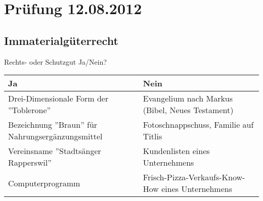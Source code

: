 \section{Prüfung 12.08.2012}
\subsection{Immaterialgüterrecht}
Rechts- oder Schutzgut Ja/Nein?\\
\begin{tabular}{|l|l|}
	\hline 
	\textbf{Ja} & \textbf{Nein} \\ 
	\hline 
	Drei-Dimensionale Form der ''Toblerone'' & Evangelium nach Markus (Bibel, Neues Testament) \\ 
	\hline 
	Bezeichnung ''Braun'' für Nahrungsergänzungsmittel & Fotoschnappschuss, Familie auf Titlis \\
	\hline
	Vereinsname ''Stadtsänger Rapperswil'' & Kundenlisten eines Unternehmens \\
	\hline
	Computerprogramm & Frisch-Pizza-Verkaufs-Know-How eines Unternehmens \\
	\hline
\end{tabular}


